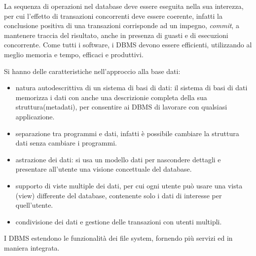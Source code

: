 \documentclass[a4paper,12pt, oneside]{book}
\begin{document}
La sequenza di operazioni nel database deve essere eseguita nella sua interezza, per cui l'effetto di
transazioni concorrenti deve essere coerente, infatti la conclusione positiva di una transazioni corrisponde ad un impegno,
\emph{commit}, a mantenere traccia del risultato, anche in presenza di guasti e di esecuzioni concorrente.\newline
Come tutti i software, i DBMS devono essere efficienti, utilizzando al meglio memoria e tempo, efficaci e produttivi.

Si hanno delle caratteristiche nell'approccio alla base dati:
\begin{itemize}
	\item natura autodescrittiva di un sistema di basi di dati: il sistema di basi di dati memorizza i dati con
	      anche una descrizionie completa della sua struttura(metadati), per consentire ai DBMS di lavorare con qualsiasi applicazione.
	\item separazione tra programmi e dati, infatti è possibile cambiare la struttura dati senza cambiare i programmi.
	\item astrazione dei dati: si usa un modello dati per nascondere dettagli e presentare
	      all'utente una visione concettuale del database.
	\item supporto di viste multiple dei dati, per cui ogni utente può usare una vista (view) differente del
	      database, contenente solo i dati di interesse per quell'utente.
	\item condivisione dei dati e gestione delle transazioni con utenti multipli.
\end{itemize}
I DBMS estendono le funzionalità dei file system, fornendo più servizi ed in maniera integrata.
\end{document}
